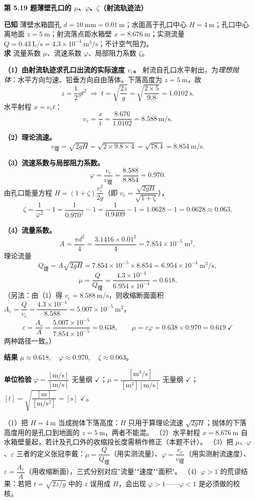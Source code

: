 \noindent\textbf{第 5.19 题\quad 薄壁孔口的 $\mu$、$\varphi$、$\zeta$（射流轨迹法）}

\begin{jie}
\textbf{已知} 薄壁水箱圆孔 $d=10\ \mathrm{mm}=0.01\ \mathrm{m}$；水面高于孔口中心 $H=4\ \mathrm{m}$；孔口中心离地面 $z=5\ \mathrm{m}$；射流落点距水箱壁 $x=8.676\ \mathrm{m}$；实测流量 $Q=0.43\ \mathrm{L/s}=4.3\times10^{-4}\ \mathrm{m^3/s}$；不计空气阻力。\\
\textbf{求} 流量系数 $\mu$、流速系数 $\varphi$、局部阻力系数 $\zeta$。

\textbf{（1）由射流轨迹求孔口出流的实际速度 $v_c$。} 射流自孔口水平射出，为\emph{理想抛体}：水平方向匀速、铅垂方向自由落体。下落高度为 $z=5\ \mathrm{m}$，故
\[z=\frac12gt^2\;\Longrightarrow\;t=\sqrt{\frac{2z}{g}}=\sqrt{\frac{2\times5}{9.8}}=1.0102\ \mathrm{s}.\]
水平射程 $x=v_ct$：
\[v_c=\frac{x}{t}=\frac{8.676}{1.0102}=8.588\ \mathrm{m/s}.\]

\textbf{（2）理论流速。}
\[v_{\text{理}}=\sqrt{2gH}=\sqrt{2\times9.8\times4}=\sqrt{78.4}=8.854\ \mathrm{m/s}.\]

\textbf{（3）流速系数与局部阻力系数。}
\[\varphi=\frac{v_c}{v_{\text{理}}}=\frac{8.588}{8.854}=0.970.\]
由孔口能量方程 $H=(1+\zeta)\dfrac{v_c^2}{2g}$（即 $v_c=\dfrac{\sqrt{2gH}}{\sqrt{1+\zeta}}$），
\[\zeta=\frac{1}{\varphi^2}-1=\frac{1}{0.970^2}-1=\frac{1}{0.9409}-1=1.0628-1=0.0628\approx0.063.\]

\textbf{（4）流量系数。}
\[A=\frac{\pi d^2}{4}=\frac{3.1416\times0.01^2}{4}=7.854\times10^{-5}\ \mathrm{m^2},\]
理论流量
\[Q_{\text{理}}=A\sqrt{2gH}=7.854\times10^{-5}\times8.854=6.954\times10^{-4}\ \mathrm{m^3/s},\]
\[\mu=\frac{Q}{Q_{\text{理}}}=\frac{4.3\times10^{-4}}{6.954\times10^{-4}}=0.618.\]
（另法：由（1）得 $v_c=8.588\ \mathrm{m/s}$，则收缩断面面积 $A_c=\dfrac{Q}{v_c}=\dfrac{4.3\times10^{-4}}{8.588}=5.007\times10^{-5}\ \mathrm{m^2}$，
\[\varepsilon=\frac{A_c}{A}=\frac{5.007\times10^{-5}}{7.854\times10^{-5}}=0.638,\qquad
\mu=\varepsilon\varphi=0.638\times0.970=0.619\ \checkmark\]
两种路径一致。）

\textbf{结果} $\boxed{\mu\approx0.618,\quad \varphi\approx0.970,\quad \zeta\approx0.063}$。

\textbf{单位检验} $\varphi=\dfrac{[\mathrm{m/s}]}{[\mathrm{m/s}]}$ 无量纲 $\checkmark$；$\mu=\dfrac{[\mathrm{m^3/s}]}{[\mathrm{m^2}][\mathrm{m/s}]}$ 无量纲 $\checkmark$；$[t]=\sqrt{\dfrac{[\mathrm{m}]}{[\mathrm{m/s^2}]}}=[\mathrm{s}]$ $\checkmark$。
\end{jie}
\begin{yicuo}
（1）把 $H=4\ \mathrm{m}$ 当成抛体下落高度：$H$ 只用于算理论流速 $\sqrt{2gH}$；抛体的下落高度用的是孔口到地面的 $z=5\ \mathrm{m}$，两者不能混。
（2）水平射程 $x=8.676\ \mathrm{m}$ 自水箱壁量起，若计及孔口外的收缩段长度需稍作修正（本题不计）。
（3）把 $\mu$、$\varphi$、$\varepsilon$ 三者的定义张冠李戴：$\mu=\dfrac{Q}{Q_{\text{理}}}$（用实测流量）、$\varphi=\dfrac{v_c}{v_{\text{理}}}$（用实测射流速度）、$\varepsilon=\dfrac{A_c}{A}$（用收缩断面），三式分别对应"流量""速度""面积"。
（4）$\varphi>1$ 的荒谬结果：若把 $t=\sqrt{2z/g}$ 中的 $z$ 误用成 $H$，会出现 $\varphi>1$——$\varphi<1$ 是必须做的校核。
\end{yicuo}
